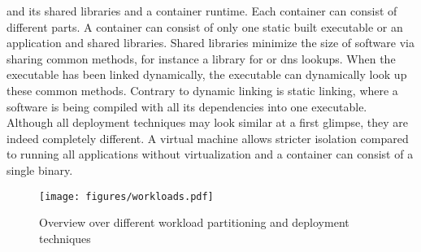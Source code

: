 \documentclass[titlepage]{report}
\begin{document}
and its shared libraries and a container runtime. Each container can consist of different parts. A container can consist of only one static built executable or an application and shared libraries.
Shared libraries minimize the size of software via sharing common methods, for instance a library for  or \gls{dns} lookups. When the executable has been linked dynamically,
the executable can dynamically look up these common methods.
Contrary to dynamic linking is static linking, where a software is being compiled with all its dependencies into one executable. Although all deployment techniques may look similar at a first glimpse,
they are indeed completely different. A virtual machine allows stricter isolation compared to running all applications without virtualization and a container can consist of a single binary.
\begin{figure}
    \centering
    \texttt{[image: figures/workloads.pdf]}
    \caption{Overview over different workload partitioning and deployment techniques}\label{fig:workloads}
\end{figure}
\end{document}
